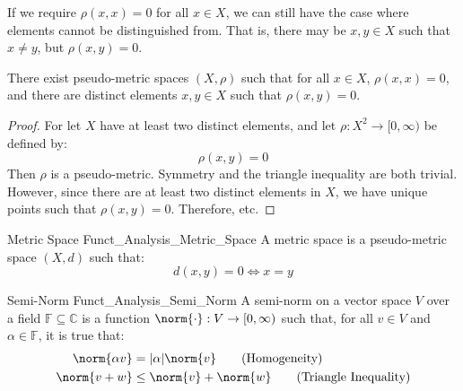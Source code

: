             If we require $\rho(x,x)=0$ for all $x\in{X}$, we
            can still have the case where elements cannot be
            distinguished from. That is, there may be
            $x,y\in{X}$ such that $x\ne{y}$, but
            $\rho(x,y)=0$.
            \begin{theorem}
                There exist pseudo-metric spaces $(X,\rho)$
                such that for all $x\in{X}$, $\rho(x,x)=0$,
                and there are distinct elements $x,y\in{X}$
                such that $\rho(x,y)=0$.
            \end{theorem}
            \begin{proof}
                For let $X$ have at least two distinct elements,
                and let $\rho:X^{2}\rightarrow[0,\infty)$
                be defined by:
                \begin{equation}
                    \rho(x,y)=0
                \end{equation}
                Then $\rho$ is a pseudo-metric. Symmetry and
                the triangle inequality are both trivial.
                However, since there are at least two distinct
                elements in $X$, we have unique points such that
                $\rho(x,y)=0$. Therefore, etc.
            \end{proof}
            \begin{ldefinition}{Metric Space}
                  {Funct_Analysis_Metric_Space}
                A metric space is a pseudo-metric space $(X,d)$
                such that:
                \begin{equation}
                    d(x,y)=0\Longleftrightarrow{x}=y
                    \tag{Definiteness}
                \end{equation}
            \end{ldefinition}
            \begin{ldefinition}{Semi-Norm}
                  {Funct_Analysis_Semi_Norm}
                A semi-norm on a vector space $V$ over a field
                $\mathbb{F}\subseteq\mathbb{C}$ is a function
                $\norm{\cdot}:V\rightarrow[0,\infty)$ such that, for
                all $v\in{V}$ and $\alpha\in\mathbb{F}$,
                it is true that:
                \begin{align}
                    \norm{\alpha{v}}
                    &=|\alpha|\norm{v}
                    \tag{Homogeneity}\\
                    \norm{v+w}
                    &\leq\norm{v}+\norm{w}
                    \tag{Triangle Inequality}
                \end{align}
            \end{ldefinition}

